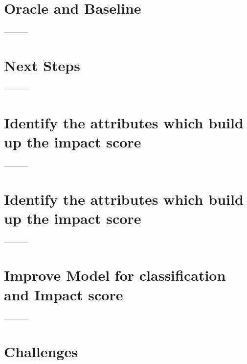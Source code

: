 \documentclass{article}
\begin{document}

\section*{Oracle and Baseline} %





-----------

\section*{Next Steps} %


-----------

\section*{Identify the attributes which build up the impact score} %


-----------

\section*{Identify the attributes which build up the impact score} %



-----------

\section*{Improve Model for classification and Impact score} %

-----------

\section*{Challenges} %
\end{document}
